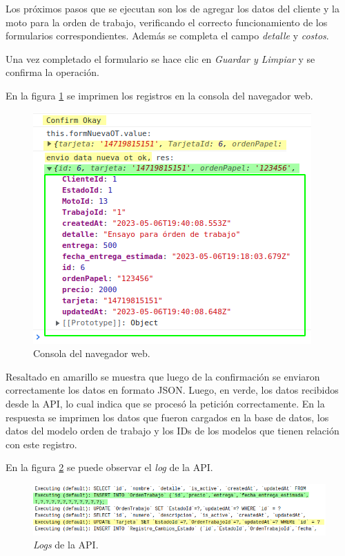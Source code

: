 Los próximos pasos que se ejecutan son los de agregar los datos del cliente y la moto para la orden de trabajo, verificando el correcto funcionamiento de los formularios correspondientes. Además se completa el campo \textit{detalle} y \textit{costos}.

Una vez completado el formulario se hace clic en \textit{Guardar y Limpiar} y se confirma la operación.

En la figura \ref{fig:ensayonueva10} se imprimen los registros en la consola del navegador web.

\begin{figure}[H]
	\centering
	\includegraphics[scale=1.1]{./Figures/ensayo-1/10.nueva-res.png}
	\caption{Consola del navegador web.}
	\label{fig:ensayonueva10}
\end{figure}

Resaltado en amarillo se muestra que luego de la confirmación se enviaron correctamente los datos en formato JSON. Luego, en verde, los datos recibidos desde la API, lo cual indica que se procesó la petición correctamente. En la respuesta se imprimen los datos que fueron cargados en la base de datos, los datos del modelo orden de trabajo y los IDs de los modelos que tienen relación con este registro.

En la figura \ref{fig:ensayonueva10-2} se puede observar el \textit{log} de la API.

\begin{figure}[H]
	\centering
	\includegraphics[width=\textwidth]{./Figures/ensayo-1/10.nueva-api-log.png}
	\caption{\textit{Logs} de la API.}
	\label{fig:ensayonueva10-2}
\end{figure}

